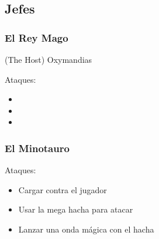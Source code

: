 \subsection{Jefes}


\subsubsection{El Rey Mago}

(The Host) Oxymandias

Ataques:
\begin{itemize}
    \item {}
    \item {}
    \item {}
\end{itemize}


\subsubsection{El Minotauro}


Ataques:
\begin{itemize}
    \item Cargar contra el jugador
    \item Usar la mega hacha para atacar
    \item Lanzar una onda mágica con el hacha
\end{itemize}


